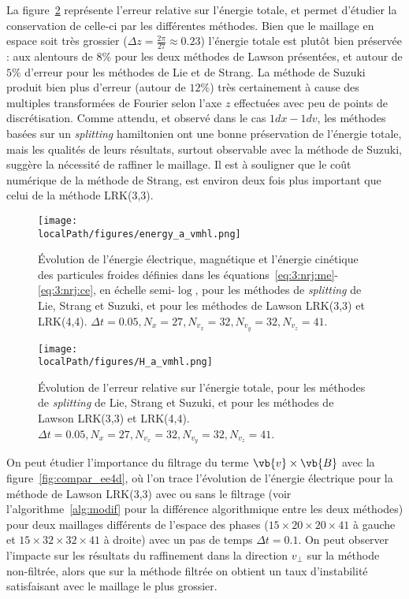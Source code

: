 La figure~\ref{fig:energy_tot4d} représente l'erreur relative sur l'énergie totale, et permet d'étudier la conservation de celle-ci par les différentes méthodes. Bien que le maillage en espace soit très grossier ($\Delta z = \frac{2\pi}{27} \approx 0.23$) l'énergie totale est plutôt bien préservée : aux alentours de $8\%$ pour les deux méthodes de Lawson présentées, et autour de $5\%$ d'erreur pour les méthodes de Lie et de Strang. La méthode de Suzuki produit bien plus d'erreur (autour de $12\%$) très certainement à cause des multiples transformées de Fourier selon l'axe $z$ effectuées avec peu de points de discrétisation. Comme attendu, et observé dans le cas $1dx-1dv$, les méthodes basées sur un \emph{splitting} hamiltonien ont une bonne préservation de l'énergie totale, mais les qualités de leurs résultats, surtout observable avec la méthode de Suzuki, suggère la nécessité de raffiner le maillage. Il est à souligner que le coût numérique de la méthode de Strang, est environ deux fois plus important que celui de la méthode LRK(3,3).

\begin{figure}[h]
  \centering
  \texttt{[image: \\localPath/figures/energy\_a\_vmhl.png]}
  \caption{Évolution de l'énergie électrique, magnétique et l'énergie cinétique des particules froides définies dans les équations~\ref{eq:3:nrj:me}-\ref{eq:3:nrj:ce}, en échelle semi-$\log$, pour les méthodes de \emph{splitting} de Lie, Strang et Suzuki, et pour les méthodes de Lawson LRK(3,3) et LRK(4,4). $\Delta t = 0.05, N_x=27, N_{v_x}=32, N_{v_y}=32, N_{v_z}=41$.}
  \label{fig:energies4d}
\end{figure}

\begin{figure}[h]
  \centering
  \texttt{[image: \\localPath/figures/H\_a\_vmhl.png]}
  \caption{Évolution de l'erreur relative sur l'énergie totale, pour les méthodes de \emph{splitting} de Lie, Strang et Suzuki, et pour les méthodes de Lawson LRK(3,3) et LRK(4,4). $\Delta t = 0.05, N_x=27, N_{v_x}=32, N_{v_y}=32, N_{v_z}=41$.}
  \label{fig:energy_tot4d}
\end{figure}

On peut étudier l'importance du filtrage du terme $\vb{v}\times\vb{B}$ avec la figure~\ref{fig:compar_ee4d}, où l'on trace l'évolution de l'énergie électrique pour la méthode de Lawson LRK(3,3) avec ou sans le filtrage (voir l'algorithme~\ref{alg:modif} pour la différence algorithmique entre les deux méthodes) pour deux maillages différents de l'espace des phases ($15\times20\times20\times41$ à gauche et $15\times32\times32\times41$ à droite) avec un pas de temps $\Delta t = 0.1$. On peut observer l'impacte sur les résultats du raffinement dans la direction $v_\perp$ sur la méthode non-filtrée, alors que sur la méthode filtrée on obtient un taux d'instabilité satisfaisant avec le maillage le plus grossier.

